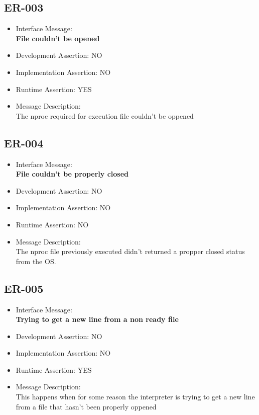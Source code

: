 \subsection{ER-003}
\begin{itemize}
  \item Interface Message:\\[1em]\textbf{File couldn't be opened}
  \item Development Assertion: NO
  \item Implementation Assertion: NO
  \item Runtime Assertion: YES
  \item Message Description:\\[1em]The nproc required for execution file couldn't be oppened
\end{itemize}

\subsection{ER-004}
\begin{itemize}
  \item Interface Message:\\[1em]\textbf{File couldn't be properly closed}
  \item Development Assertion: NO
  \item Implementation Assertion: NO
  \item Runtime Assertion: NO
  \item Message Description:\\[1em]The nproc file previously executed didn't returned a propper closed status from the OS.
\end{itemize}

\subsection{ER-005}
\begin{itemize}
  \item Interface Message:\\[1em]\textbf{Trying to get a new line from a non ready file}
  \item Development Assertion: NO
  \item Implementation Assertion: NO
  \item Runtime Assertion: YES
  \item Message Description:\\[1em]This happens when for some reason the interpreter is trying to get a new line from a file that hasn't been properly oppened
\end{itemize}

